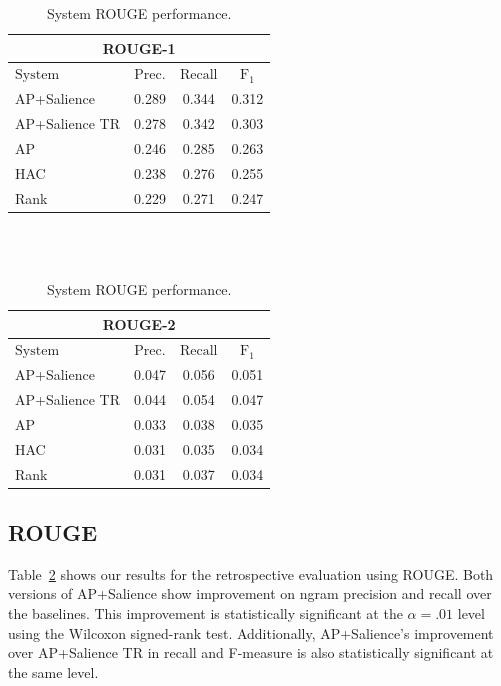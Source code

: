 \begin{table}[h]
\centering
\begin{tabular}{l c c c}
\multicolumn{4}{c}{ROUGE-1}\\
\hline
\hline
$\mathrm{System}$ & $\mathrm{Prec.}$ & $\mathrm{Recall}$ & $\mathrm{F}_1$\\
[0.5ex]
\hline
AP+Salience &          0.289   &    0.344  &  0.312  \\
AP+Salience TR &       0.278   &    0.342  &  0.303 \\
AP    &         0.246   &    0.285  &  0.263 \\
HAC     &        0.238   &    0.276  &  0.255 \\
Rank    &        0.229   &    0.271  &  0.247 \\
\hline %
\end{tabular}
~\\[1ex]
~\\
\begin{tabular}{l c c c}
\multicolumn{4}{c}{ROUGE-2}\\
\hline
\hline
$\mathrm{System}$ & $\mathrm{Prec.}$ & $\mathrm{Recall}$ & $\mathrm{F}_1$\\[0.5ex]
\hline
AP+Salience & 0.047 &     0.056 &   0.051 \\
AP+Salience TR & 0.044  &    0.054 &  0.047 \\
AP & 0.033  &    0.038 &  0.035 \\
HAC & 0.031  &    0.035 &  0.034 \\
Rank & 0.031  &    0.037 &  0.034 \\
\hline %
\end{tabular}
\caption{System ROUGE performance.} %
\label{tab:rouge}
\end{table}


\subsection{ROUGE}

Table~\ref{tab:rouge} shows our results for the retrospective evaluation using ROUGE. 
Both versions of AP+Salience show improvement on ngram precision and recall over the 
baselines. This improvement is statistically significant at the $\alpha = .01$ level
using the Wilcoxon signed-rank test. Additionally, AP+Salience's improvement over
AP+Salience TR in recall and F-measure is also statistically significant at the same level.


